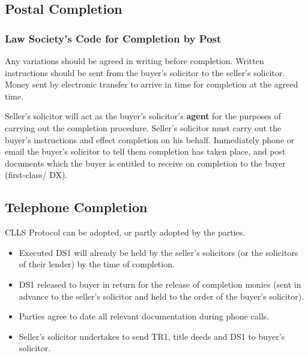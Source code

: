 \documentclass[
]{article}
\providecommand{\tightlist}{%
  \setlength{\itemsep}{0pt}\setlength{\parskip}{0pt}}
\begin{document}
\hypertarget{postal-completion}{%
\subsection{Postal Completion}\label{postal-completion}}

\hypertarget{law-societys-code-for-completion-by-post}{%
\subsubsection{Law Society's Code for Completion by
Post}\label{law-societys-code-for-completion-by-post}}

Any variations should be agreed in writing before completion. Written
instructions should be sent from the buyer's solicitor to the seller's
solicitor. Money sent by electronic transfer to arrive in time for
completion at the agreed time.

Seller's solicitor will act as the buyer's solicitor's \textbf{agent}
for the purposes of carrying out the completion procedure. Seller's
solicitor must carry out the buyer's instructions and effect completion
on his behalf. Immediately phone or email the buyer's solicitor to tell
them completion has taken place, and post documents which the buyer is
entitled to receive on completion to the buyer (first-class/ DX).

\hypertarget{telephone-completion}{%
\subsection{Telephone Completion}\label{telephone-completion}}

CLLS Protocol can be adopted, or partly adopted by the parties.

\begin{itemize}
\tightlist
\item
  Executed DS1 will already be held by the seller's solicitors (or the
  solicitors of their lender) by the time of completion.
\item
  DS1 released to buyer in return for the release of completion monies
  (sent in advance to the seller's solicitor and held to the order of
  the buyer's solicitor).
\item
  Parties agree to date all relevant documentation during phone calls.
\item
  Seller's solicitor undertakes to send TR1, title deeds and DS1 to
  buyer's solicitor.
\end{itemize}
\end{document}
